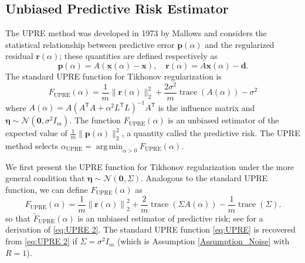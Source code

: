 \documentclass[12pt]{article}
\newcommand{\mA}{m}	%
\newcommand{\dVec}{\mathbf{d}}	%
\newcommand{\pVec}{\mathbf{p}}	%
\newcommand{\rVec}{\mathbf{r}}	%
\newcommand{\xVec}{\mathbf{x}}	%
\newcommand{\trans}[1]{{#1}^\mathsf{T}}	%
\DeclareMathOperator{\trace}{trace}		%
\newcommand{\regparam}{\alpha}  %
\newcommand{\xReg}{\xVec(\regparam)}	%
\newcommand{\xSol}{\xVec}	%
\DeclareMathOperator*{\argmin}{arg\,min}
\newcommand{\noise}{\eta}	%
\newcommand{\noiseSD}{\sigma}	%
\newcommand{\noiseVec}{\bm{\noise}}	%
\newcommand{\zeroVec}{\bm{0}}	%
\newcommand{\A}{A(\regparam)}	%
\newcommand{\U}{F_{\text{UPRE}}}	%
\newcommand{\UBig}{\widetilde{F}_{\text{UPRE}}}	%
\begin{document}

\subsection{Unbiased Predictive Risk Estimator} \label{sec:UPRE}
The UPRE method was developed in 1973 by Mallows and considers the statistical relationship between predictive error $\pVec(\regparam)$ and the regularized residual $\rVec(\regparam)$; these quantities are defined respectively as
\begin{equation}
\label{eq:Predictive Error and Regularized Residual}
\pVec(\regparam) = A(\xReg - \xSol), \quad \rVec(\regparam) = A\xReg - \dVec.
\end{equation}
The standard UPRE function for Tikhonov regularization is
\begin{equation}
\label{eq:UPRE}
\U(\alpha) = \frac{1}{\mA}\|\rVec(\regparam)\|_2^2 + \frac{2\noiseSD^2}{\mA}\trace(\A) - \noiseSD^2
\end{equation}
where $\A = A(\trans{A}A + \regparam^2\trans{L}L)^{-1}\trans{A}$ is the influence matrix and $\noiseVec \sim \mathcal{N}(\bm{0},\noiseSD^2 I_{\mA})$. The function $\U(\regparam)$ is an unbiased estimator of the expected value of $\frac{1}{\mA}\|\pVec(\regparam)\|_2^2$, a quantity called the predictive risk. The UPRE method selects $\regparam_{\textrm{UPRE}} = \argmin_{\regparam > 0} \U(\regparam)$. \par
We first present the UPRE function for Tikhonov regularization under the more general condition that $\noiseVec \sim \mathcal{N}(\bm{0},\Sigma)$. Analogous to the standard UPRE function, we can define $\U(\regparam)$ as
\begin{equation}
\label{eq:UPRE 2}
\U(\regparam) = \frac{1}{\mA}\left\|\rVec(\regparam)\right\|_2^2 + \frac{2}{\mA}\trace\left(\Sigma\A\right) - \frac{1}{\mA}\trace\left(\Sigma\right).
\end{equation}
so that $\UBig(\regparam)$ is an unbiased estimator of predictive risk; see \cite{Byrne} for a derivation of \eqref{eq:UPRE 2}. The standard UPRE function \eqref{eq:UPRE} is recovered from \eqref{eq:UPRE 2} if $\Sigma = \noiseSD^2 I_{\mA}$ (which is Assumption \ref{Assumption_Noise} with $R = 1$).
\end{document}
